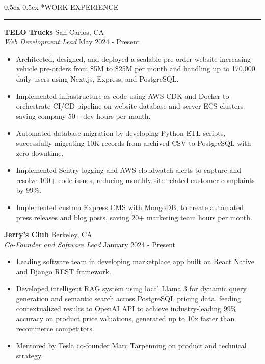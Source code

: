 \documentclass[11pt,a4paper]{article}
\makeatletter
\renewcommand\section{\@startsection{section}{1}{0pt}%
  {0.5ex}%
  {0.5ex}%
  {\normalsize\bfseries}}%
\makeatother
\begin{document}
\section*{WORK EXPERIENCE}
\vspace{2mm}
\hrule
\vspace{4mm}
\noindent\textbf{TELO Trucks} \hfill San Carlos, CA\\
\textit{Web Development Lead} \hfill May 2024 - Present
\begin{itemize}[itemsep=0pt]
\item Architected, designed, and deployed a scalable pre-order website increasing vehicle pre-orders from \$5M to \$25M per month and handling up to 170,000 daily users using Next.js, Express, and PostgreSQL.
\item Implemented infrastructure as code using AWS CDK and Docker to orchestrate CI/CD pipeline on website database and server ECS clusters saving company 50+ dev hours per month.
\item Automated database migration by developing Python ETL scripts, successfully migrating 10K records from archived CSV to PostgreSQL with zero downtime.
\item Implemented Sentry logging and AWS cloudwatch alerts to capture and resolve 100+ code issues, reducing monthly site-related customer complaints by 99\%.
\item Implemented custom Express CMS with MongoDB, to create automated press releases and blog posts, saving 20+ marketing team hours per month.
\end{itemize}

\noindent\textbf{Jerry's Club} \hfill Berkeley, CA\\
\textit{Co-Founder and Software Lead} \hfill January 2024 - Present
\begin{itemize}[itemsep=0pt]
\item Leading software team in developing marketplace app built on React Native and Django REST framework.
\item Developed intelligent RAG system using local Llama 3 for dynamic query generation and semantic search across PostgreSQL pricing data, feeding contextualized results to OpenAI API to achieve industry-leading 99\% accuracy on product price valuations, generated up to 10x faster than recommerce competitors.
\item Mentored by Tesla co-founder Marc Tarpenning on product and technical strategy.
\end{itemize}
\end{document}

